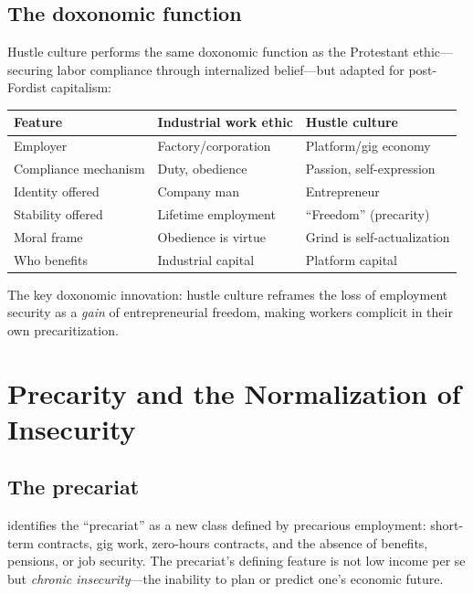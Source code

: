 \subsection{The doxonomic function}

\begin{proposition}
\label{prop:hustle-discipline}
Hustle culture performs the same doxonomic function as the Protestant ethic---securing labor compliance through internalized belief---but adapted for post-Fordist capitalism:
\begin{center}
\begin{tabular}{lll}
\toprule
Feature & Industrial work ethic & Hustle culture \\
\midrule
Employer & Factory/corporation & Platform/gig economy \\
Compliance mechanism & Duty, obedience & Passion, self-expression \\
Identity offered & Company man & Entrepreneur \\
Stability offered & Lifetime employment & ``Freedom'' (precarity) \\
Moral frame & Obedience is virtue & Grind is self-actualization \\
Who benefits & Industrial capital & Platform capital \\
\bottomrule
\end{tabular}
\end{center}
The key doxonomic innovation: hustle culture reframes the loss of employment security as a \emph{gain} of entrepreneurial freedom, making workers complicit in their own precaritization.
\end{proposition}

\section{Precarity and the Normalization of Insecurity}
\label{sec:ch26-precarity}

\subsection{The precariat}

\textcite{standing2011} identifies the ``precariat'' as a new class defined by precarious employment: short-term contracts, gig work, zero-hours contracts, and the absence of benefits, pensions, or job security.
The precariat's defining feature is not low income per se but \emph{chronic insecurity}---the inability to plan or predict one's economic future.

